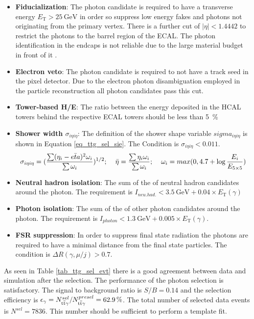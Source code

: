 \begin{itemize}
\item \textbf{Fiducialization}: The photon candidate is required to have a transverse energy $E_{\mathrm{T}} > \SI{25}{\giga \electronvolt}$ in order so suppress low energy fakes and photons not originating from the primary vertex. There is a further cut of $| \eta | < 1.4442$ to restrict the photons to the barrel region of the ECAL. The photon identification in the endcaps is not reliable due to the large material budget in front of it \cite{tholen:ma}.
\item \textbf{Electron veto}: The photon candidate is required to not have a track seed in the pixel detector. Due to the electron photon disambiguation employed in the particle reconstruction all photon candidates pass this cut.
\item \textbf{Tower-based H/E}: The ratio between the energy deposited in the HCAL towers behind the respective ECAL towers should be less than \SI{5}{\percent}
\item \textbf{Shower width $\sigma_{i \eta i \eta}$}: The definition of the shower shape variable $sigma_{i \eta i \eta}$ is shown in Equation \ref{eq_ttg_sel_sie}. The Condition is $\sigma_{i \eta i \eta} < 0.011$.
\begin{equation}
\sigma_{i \eta i \eta} = (\frac{\sum (\eta_i - \bar{eta})^2 \omega_i}{\sum \omega_i})^{1/2} ; \hspace{0.4cm} \bar{\eta} = \frac{\sum \eta_i \omega_i}{\sum \omega_i}; \hspace{0.4cm} \omega_i = max(0,4.7 + \log{\frac{E_i}{E_{5 \times 5}}})
\label{eq_ttg_sel_sie}
\end{equation}
\item \textbf{Neutral hadron isolation}: The sum of the \pt of neutral hadron candidates around the photon. The requirement is $I_{neu.had.} < \SI{3.5}{\giga \electronvolt} + 0.04 \times E_{\mathrm{T}}(\gamma)$  
\item \textbf{Photon isolation}: The sum of the \pt of other photon candidates around the photon. The requirement is $I_{photon} < \SI{1.3}{\giga \electronvolt} + 0.005 \times E_{\mathrm{T}}(\gamma)$. 
\item \textbf{FSR suppression}: In order to suppress final state radiation the photons are required to have a minimal distance from the final state particles. The condition is $\Delta R (\gamma,\mu /j) > 0.7$.
\end{itemize}

As seen in Table \ref{tab_ttg_sel_evt} there is a good agreement between data and simulation after the selection. The performance of the photon selection is satisfactory. The signal to background ratio is $S/B = 0.14$ and the \ttgamma selection efficiency is $\epsilon_\gamma = N^{sel}_{\mathrm{t}\overline{\mathrm{t}} \gamma} / N^{presel}_{\mathrm{t}\overline{\mathrm{t}} \gamma} = \SI{62.9}{\percent}$. The total number of selected data events is $N^{sel} = 7836$. This number should be sufficient to perform a template fit.

